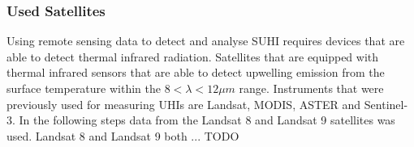 \documentclass[12pt,a4paper, english,twoside]{article}
\begin{document}
  \subsubsection{Used Satellites}
    Using remote sensing data to detect and analyse \gls{SUHI} requires devices that are able to detect thermal infrared radiation. 
    Satellites that are equipped with thermal infrared sensors that are able to detect upwelling emission from the surface temperature within the $ 8 < \lambda < 12 \mu m $ range. 
    Instruments that were previously used for measuring \glspl{UHI} are Landsat, MODIS, ASTER and Sentinel-3. 
    In the following steps data from the Landsat 8 and Landsat 9 satellites was used.%
    Landsat 8 and Landsat 9 both ... TODO 
\end{document}
